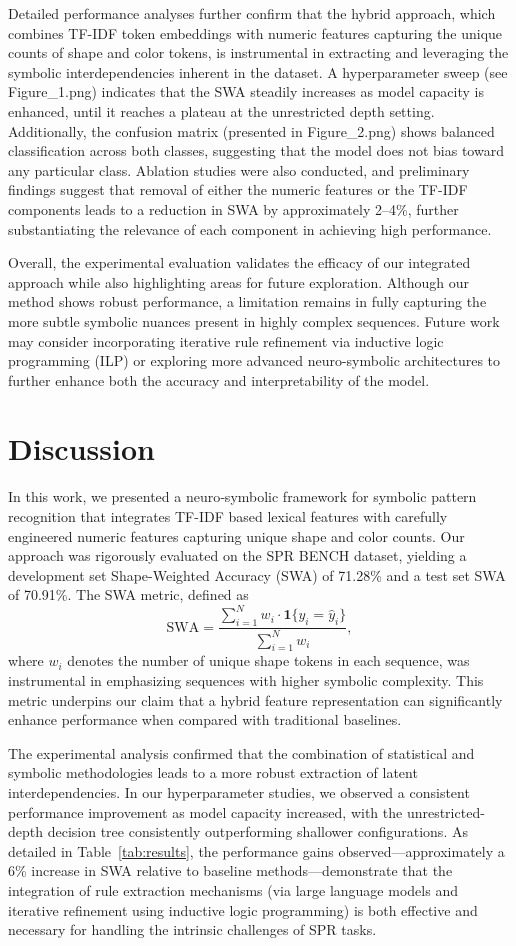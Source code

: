 \documentclass{article}
\begin{document}
Detailed performance analyses further confirm that the hybrid approach, which combines TF-IDF token embeddings with numeric features capturing the unique counts of shape and color tokens, is instrumental in extracting and leveraging the symbolic interdependencies inherent in the dataset. A hyperparameter sweep (see Figure\_1.png) indicates that the SWA steadily increases as model capacity is enhanced, until it reaches a plateau at the unrestricted depth setting. Additionally, the confusion matrix (presented in Figure\_2.png) shows balanced classification across both classes, suggesting that the model does not bias toward any particular class. Ablation studies were also conducted, and preliminary findings suggest that removal of either the numeric features or the TF-IDF components leads to a reduction in SWA by approximately 2--4\%, further substantiating the relevance of each component in achieving high performance.

Overall, the experimental evaluation validates the efficacy of our integrated approach while also highlighting areas for future exploration. Although our method shows robust performance, a limitation remains in fully capturing the more subtle symbolic nuances present in highly complex sequences. Future work may consider incorporating iterative rule refinement via inductive logic programming (ILP) or exploring more advanced neuro-symbolic architectures to further enhance both the accuracy and interpretability of the model.

\section{Discussion}
In this work, we presented a neuro‐symbolic framework for symbolic pattern recognition that integrates TF-IDF based lexical features with carefully engineered numeric features capturing unique shape and color counts. Our approach was rigorously evaluated on the SPR BENCH dataset, yielding a development set Shape-Weighted Accuracy (SWA) of 71.28\% and a test set SWA of 70.91\%. The SWA metric, defined as 
\[
\text{SWA} = \frac{\sum_{i=1}^{N} w_i \cdot \mathbf{1}\{y_i=\hat{y}_i\}}{\sum_{i=1}^{N} w_i},
\]
where \(w_i\) denotes the number of unique shape tokens in each sequence, was instrumental in emphasizing sequences with higher symbolic complexity. This metric underpins our claim that a hybrid feature representation can significantly enhance performance when compared with traditional baselines.

The experimental analysis confirmed that the combination of statistical and symbolic methodologies leads to a more robust extraction of latent interdependencies. In our hyperparameter studies, we observed a consistent performance improvement as model capacity increased, with the unrestricted-depth decision tree consistently outperforming shallower configurations. As detailed in Table~\ref{tab:results}, the performance gains observed—approximately a 6\% increase in SWA relative to baseline methods—demonstrate that the integration of rule extraction mechanisms (via large language models and iterative refinement using inductive logic programming) is both effective and necessary for handling the intrinsic challenges of SPR tasks.
\end{document}
